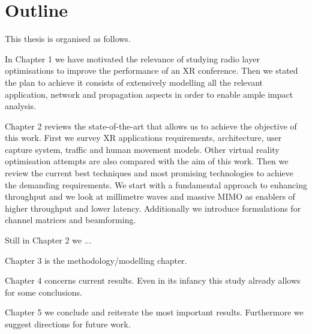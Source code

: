 \section{Outline}
\label{sec:outline}

This thesis is organised as follows.

In Chapter 1 we have motivated the relevance of studying radio layer optimisations to improve the performance of an \ac{XR} conference. Then we stated the plan to achieve it consists of extensively modelling all the relevant application, network and propagation aspects in order to enable ample impact analysis.

Chapter 2 reviews the state-of-the-art that allows us to achieve the objective of this work. First we survey XR applications requirements, architecture, user capture system, traffic and human movement models. Other virtual reality optimisation attempts are also compared with the aim of this work. Then we review the current best techniques and most promising technologies to achieve the demanding requirements. We start with a fundamental approach to enhancing throughput and we look at millimetre waves and massive MIMO as enablers of higher throughput and lower latency. Additionally we introduce formulations for channel matrices and beamforming.

Still in Chapter 2 we ... 

Chapter 3 is the methodology/modelling chapter.


Chapter 4 concerns current results. Even in its infancy this study already allows for some conclusions.


Chapter 5 we conclude and reiterate the most important results. Furthermore we suggest directions for future work.